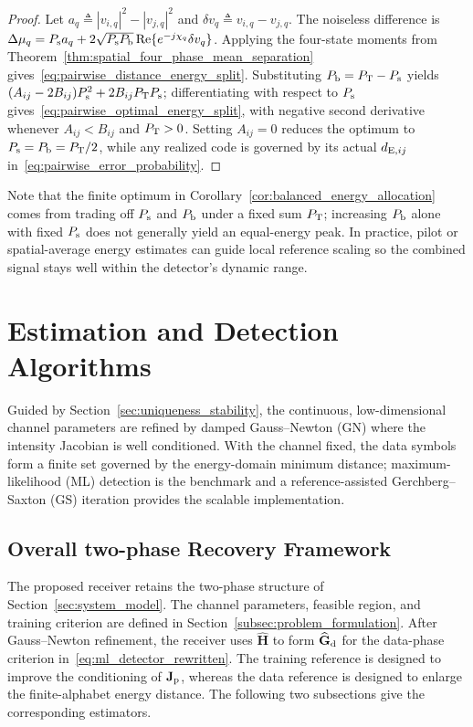 \documentclass[journal]{IEEEtran}
\begin{document}
\begin{proof}
Let $a_q \triangleq |v_{i,q}|^{2} - |v_{j,q}|^{2}$ and $\delta v_q \triangleq v_{i,q} - v_{j,q}$. The noiseless difference is $\Delta\mu_q = P_{\rm s}a_q + 2\sqrt{P_{\rm s}P_{\rm b}}\operatorname{Re}\{e^{-j\chi_q}\delta v_q\}$. Applying the four-state moments from Theorem~\ref{thm:spatial_four_phase_mean_separation} gives~\eqref{eq:pairwise_distance_energy_split}. Substituting $P_{\rm b} = P_{\rm T} - P_{\rm s}$ yields $(A_{ij} - 2B_{ij})P_{\rm s}^{2} + 2B_{ij}P_{\rm T}P_{\rm s}$; differentiating with respect to $P_{\rm s}$ gives~\eqref{eq:pairwise_optimal_energy_split}, with negative second derivative whenever $A_{ij} < B_{ij}$ and $P_{\rm T} > 0$. Setting $A_{ij} = 0$ reduces the optimum to $P_{\rm s} = P_{\rm b} = P_{\rm T}/2$, while any realized code is governed by its actual $d_{{\rm E},ij}$ in~\eqref{eq:pairwise_error_probability}.
\end{proof}

Note that the finite optimum in Corollary~\ref{cor:balanced_energy_allocation} comes from trading off $P_{\rm s}$ and $P_{\rm b}$ under a fixed sum $P_{\rm T}$; increasing $P_{\rm b}$ alone with fixed $P_{\rm s}$ does not generally yield an equal-energy peak. In practice, pilot or spatial-average energy estimates can guide local reference scaling so the combined signal stays well within the detector's dynamic range.


\section{Estimation and Detection Algorithms}
\label{sec:algorithms}

Guided by Section~\ref{sec:uniqueness_stability}, the continuous,
low-dimensional channel parameters are refined by damped Gauss--Newton (GN)
where the intensity Jacobian is well conditioned.  With the channel fixed, the
data symbols form a finite set governed by the energy-domain minimum distance;
maximum-likelihood (ML) detection is the benchmark and a reference-assisted
Gerchberg--Saxton (GS) iteration provides the scalable implementation.

\subsection{Overall two-phase Recovery Framework}
\label{subsec:overall_framework}

The proposed receiver retains the two-phase structure of Section~\ref{sec:system_model}.
The channel parameters, feasible region, and training criterion are defined in
Section~\ref{subsec:problem_formulation}. After Gauss--Newton refinement, the
receiver uses $\widehat{\mathbf H}$ to form
$\widehat{\mathbf G}_{\rm d}$ for the data-phase criterion
in~\eqref{eq:ml_detector_rewritten}. The training reference is designed to
improve the conditioning of $\mathbf J_{\rm p}$, whereas the data reference is
designed to enlarge the finite-alphabet energy distance. The following two
subsections give the corresponding estimators.
\end{document}
